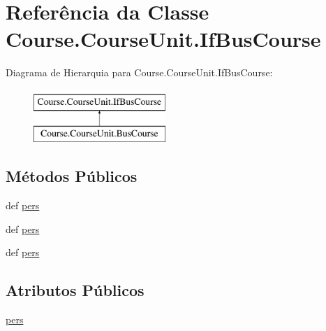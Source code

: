 \hypertarget{classCourse_1_1CourseUnit_1_1IfBusCourse}{\section{Referência da Classe Course.\-Course\-Unit.\-If\-Bus\-Course}
\label{classCourse_1_1CourseUnit_1_1IfBusCourse}
}
Diagrama de Hierarquia para Course.\-Course\-Unit.\-If\-Bus\-Course\-:\begin{figure}[H]
\begin{center}
\leavevmode
\includegraphics[height=2.000000cm]{d0/d28/classCourse_1_1CourseUnit_1_1IfBusCourse}
\end{center}
\end{figure}
\subsection*{Métodos Públicos}
\begin{DoxyCompactItemize}
\item 
def \hyperlink{classCourse_1_1CourseUnit_1_1IfBusCourse_adf5702dec1a99bbb31936b7f1d425a40}{pers}
\item 
def \hyperlink{classCourse_1_1CourseUnit_1_1IfBusCourse_adf5702dec1a99bbb31936b7f1d425a40}{pers}
\item 
def \hyperlink{classCourse_1_1CourseUnit_1_1IfBusCourse_adf5702dec1a99bbb31936b7f1d425a40}{pers}
\end{DoxyCompactItemize}
\subsection*{Atributos Públicos}
\begin{DoxyCompactItemize}
\item 
\hyperlink{classCourse_1_1CourseUnit_1_1IfBusCourse_ab926ae8fb127b7697e2b63025df09a78}{pers}
\end{DoxyCompactItemize}


